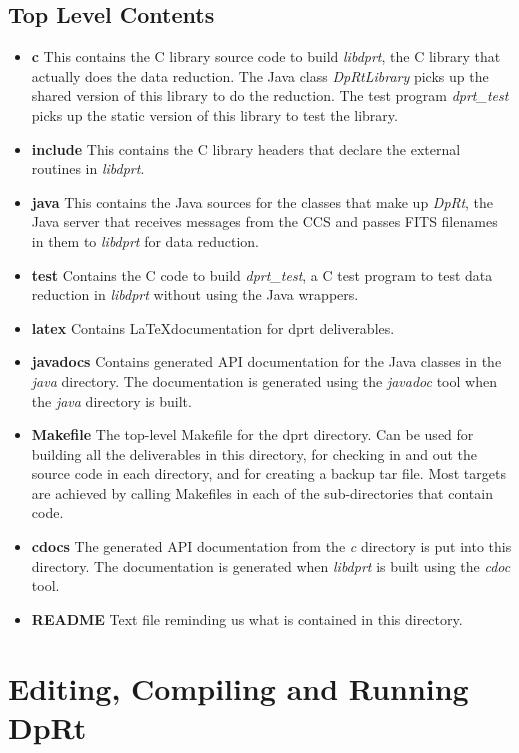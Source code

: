\documentclass[10pt,a4paper]{article}
\begin{document}
\subsection{Top Level Contents}
\begin{itemize}
\item {\bf c} This contains the C library source code to build {\em libdprt}, the C library that actually does the
data reduction. The Java class {\em DpRtLibrary} picks up the shared version of this library to do the reduction.
The test program {\em dprt\_test} picks up the static version of this library to test the library.
\item {\bf include} This contains the C library headers that declare the external routines in {\em libdprt}.
\item {\bf java} This contains the Java sources for the classes that make up {\em DpRt}, the Java server that 
receives messages from the CCS and passes FITS filenames in them to {\em libdprt} for data reduction.
\item {\bf test} Contains the C code to build {\em dprt\_test}, a C test program to test data reduction in 
{\em libdprt} without using the Java wrappers.
\item {\bf latex} Contains \LaTeX documentation for dprt deliverables.
\item {\bf javadocs} Contains generated API documentation for the Java classes in the {\em java} directory. The 
documentation is generated using the {\em javadoc} tool when the {\em java} directory is built.
\item {\bf Makefile} The top-level Makefile for the dprt directory. Can be used for building all the
deliverables in this directory, for checking in  and out the source code in each directory, and for creating a 
backup tar file. Most targets are achieved by calling Makefiles in each of the sub-directories that contain code.
\footnotemark
\item {\bf cdocs} The generated API documentation from the {\em c} directory is put into this directory. The
documentation is generated when {\em libdprt} is built using the {\em cdoc} tool.
\item {\bf README} Text file reminding us what is contained in this directory.
\end{itemize}

\section{Editing, Compiling and Running DpRt}
\end{document}
